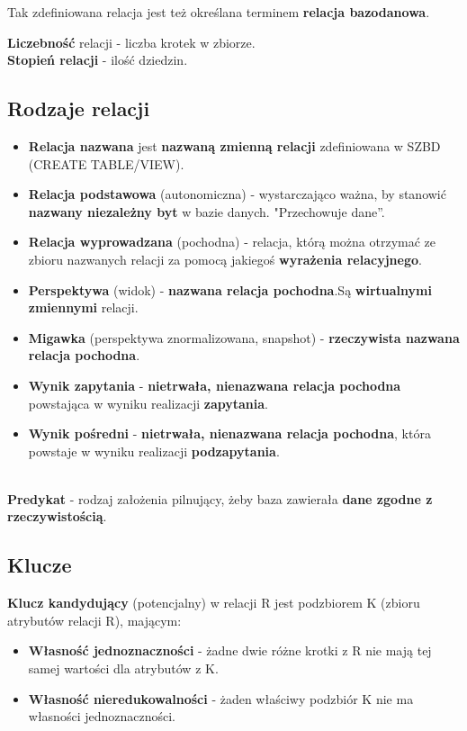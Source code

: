 \documentclass[a4paper]{article}
\begin{document}
Tak zdefiniowana relacja jest też określana terminem \textbf{relacja bazodanowa}.

\textbf{Liczebność} relacji - liczba krotek w zbiorze.\\
\textbf{Stopień relacji} - ilość dziedzin.\\

\subsection{Rodzaje relacji}
\begin{itemize}
    \item \textbf{Relacja nazwana} jest \textbf{nazwaną zmienną relacji} zdefiniowana w SZBD (CREATE TABLE/VIEW).
    \item \textbf{Relacja podstawowa} (autonomiczna) - wystarczająco ważna, by stanowić \textbf{nazwany niezależny byt} w bazie danych. "Przechowuje dane”.
    \item \textbf{Relacja wyprowadzana} (pochodna) - relacja, którą można otrzymać ze zbioru nazwanych relacji za pomocą jakiegoś \textbf{wyrażenia relacyjnego}.
    \item \textbf{Perspektywa} (widok) - \textbf{nazwana relacja pochodna}.Są \textbf{wirtualnymi zmiennymi} relacji.
    \item \textbf{Migawka} (perspektywa znormalizowana, snapshot) - \textbf{rzeczywista nazwana relacja pochodna}.
    \item \textbf{Wynik zapytania} - \textbf{nietrwała, nienazwana relacja pochodna} powstająca w wyniku realizacji \textbf{zapytania}.
    \item \textbf{Wynik pośredni} - \textbf{nietrwała, nienazwana relacja pochodna}, która powstaje w wyniku realizacji \textbf{podzapytania}.
\end{itemize}
\hfill \\
\textbf{Predykat} - rodzaj założenia pilnujący, żeby baza zawierała \textbf{dane zgodne z rzeczywistością}.

\subsection{Klucze}
\textbf{Klucz kandydujący} (potencjalny) w relacji R jest podzbiorem K (zbioru atrybutów relacji R), mającym:
\begin{itemize}
    \item \textbf{Własność jednoznaczności} - żadne dwie różne krotki z R nie mają tej samej wartości dla atrybutów z K.
    \item \textbf{Własność nieredukowalności} - żaden właściwy podzbiór K nie ma własności jednoznaczności. 
\end{itemize}
\end{document}
